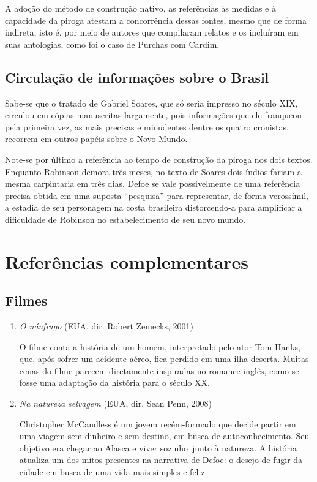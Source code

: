 \documentclass[12pt]{extarticle}
\begin{document}
A adoção do método de construção nativo, as referências às medidas e à
capacidade da piroga atestam a concorrência dessas fontes, mesmo que de
forma indireta, isto é, por meio de autores que compilaram relatos e os
incluíram em suas antologias, como foi o caso de Purchas com Cardim.

\subsection{Circulação de informações sobre o Brasil}

Sabe-se que o tratado de Gabriel Soares, que só seria impresso no século
XIX, circulou em cópias manuscritas largamente, pois informações que ele
franqueou pela primeira vez, as mais precisas e minudentes dentre os
quatro cronistas, recorrem em outros papéis sobre o Novo Mundo.

Note-se por último a referência ao tempo de construção da piroga nos
dois textos. Enquanto Robinson demora três meses, no texto de Soares
dois índios fariam a mesma carpintaria em três dias. Defoe se vale
possivelmente de uma referência precisa obtida em uma suposta
``pesquisa'' para representar, de forma verossímil, a estadia de seu
personagem na costa brasileira distorcendo-a para amplificar a
dificuldade de Robinson no estabelecimento de seu novo mundo.



\section{Referências complementares}


\subsection{Filmes}

\begin{enumerate}
\item
\emph{O náufrago} (EUA, dir. Robert Zemecks, 2001)


O filme conta a história de um homem, interpretado pelo ator Tom Hanks,
que, após sofrer um acidente aéreo, fica perdido em uma ilha deserta.
Muitas cenas do filme parecem diretamente inspiradas no romance inglês,
como se fosse uma adaptação da história para o século XX.

\item
\emph{Na natureza selvagem} (EUA, dir. Sean Penn, 2008)


Christopher McCandless é um jovem recém-formado que decide partir em uma
viagem sem dinheiro e sem destino, em busca de autoconhecimento. Seu
objetivo era chegar ao Alasca e viver sozinho~junto à natureza. A
história atualiza um dos mitos presentes na narrativa de Defoe: o desejo
de fugir da cidade em busca de uma vida mais simples e feliz.
\end{enumerate}
\end{document}
